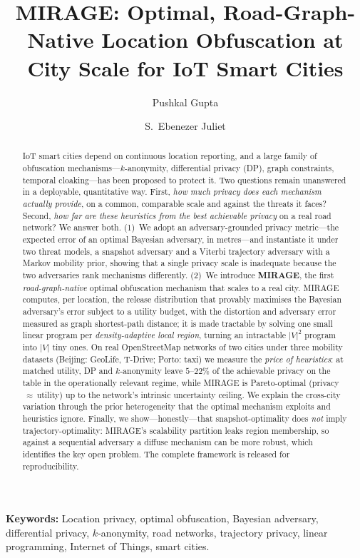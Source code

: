 \documentclass[11pt]{article}
\begin{document}
\title{\bfseries MIRAGE: Optimal, Road-Graph-Native Location Obfuscation at City Scale for IoT Smart Cities}
\author[]{Pushkal Gupta}
\author[]{S.\ Ebenezer Juliet}
\date{}
\maketitle
\begin{abstract}
IoT smart cities depend on continuous location reporting, and a large family of
obfuscation mechanisms---$k$-anonymity, differential privacy (DP), graph
constraints, temporal cloaking---has been proposed to protect it. Two questions
remain unanswered in a deployable, quantitative way. First, \emph{how much
privacy does each mechanism actually provide}, on a common, comparable scale and
against the threats it faces? Second, \emph{how far are these heuristics from the
best achievable privacy} on a real road network? We answer both. (1)~We adopt an
adversary-grounded privacy metric---the expected error of an optimal Bayesian
adversary, in metres---and instantiate it under two threat models, a snapshot
adversary and a Viterbi trajectory adversary with a Markov mobility prior,
showing that a single privacy scale is inadequate because the two adversaries
rank mechanisms differently. (2)~We introduce \textbf{MIRAGE}, the first
\emph{road-graph-native} optimal obfuscation mechanism that scales to a real
city. MIRAGE computes, per location, the release distribution that provably
maximises the Bayesian adversary's error subject to a utility budget, with the
distortion and adversary error measured as graph shortest-path distance; it is
made tractable by solving one small linear program per \emph{density-adaptive
local region}, turning an intractable $|V|^2$ program into $|V|$ tiny ones. On
real OpenStreetMap networks of two cities under three mobility datasets (Beijing:
GeoLife, T-Drive; Porto: taxi) we measure the \emph{price of heuristics}: at
matched utility, DP and $k$-anonymity leave $5\text{--}22\%$ of the achievable
privacy on the table in the operationally relevant regime, while MIRAGE is
Pareto-optimal (privacy$\,\approx\,$utility) up to the network's intrinsic
uncertainty ceiling. We explain the cross-city variation through the prior
heterogeneity that the optimal mechanism exploits and heuristics ignore. Finally,
we show---honestly---that snapshot-optimality does \emph{not} imply
trajectory-optimality: MIRAGE's scalability partition leaks region membership, so
against a sequential adversary a diffuse mechanism can be more robust, which
identifies the key open problem. The complete framework is released for
reproducibility.
\end{abstract}
\noindent\textbf{Keywords:} Location privacy, optimal obfuscation, Bayesian adversary, differential privacy, $k$-anonymity, road networks, trajectory privacy, linear programming, Internet of Things, smart cities.
\bigskip
\end{document}
